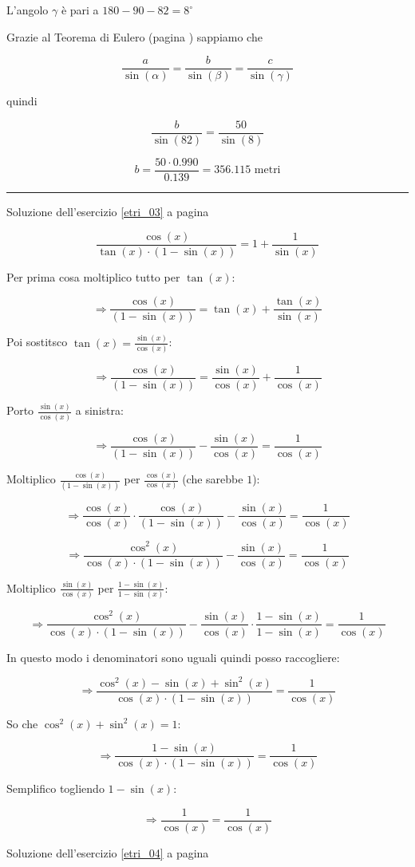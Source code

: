 L'angolo $\gamma$ è pari a $180-90-82=8^{\circ}$

Grazie al Teorema di Eulero (pagina \pageref{subs_euler}) sappiamo che 


\[
\frac{a}{\sin (\alpha)} = \frac{b}{\sin (\beta)} = \frac{c}{\sin (\gamma)}
\]

quindi

\[
\frac{b}{\sin (82)} = \frac{50}{\sin (8)}
\]

\[
b=\frac{50\cdot 0.990}{0.139}=356.115\textrm{ metri}
\]

\vspace{1cm}
\hrule
\vspace{1cm}

\begin{minipage}{\textwidth}
Soluzione dell'esercizio \ref{etri_03} a pagina \pageref{etri_03}\label{stri_03}


\[
\frac{
\cos(x)
}{
\tan(x)\cdot\left(1-\sin(x)\right)
} = 1+\frac{1}{\sin(x)}
\]


Per prima cosa moltiplico tutto per $\tan(x)$:

\[
\Rightarrow\frac{
\cos(x)
}{
\left(1-\sin(x)\right)
} = \tan(x)+\frac{\tan(x)}{\sin(x)}
\]

Poi sostitsco $\tan(x)=\frac{\sin(x)}{\cos(x)}$:


\[
\Rightarrow\frac{
\cos(x)
}{
\left(1-\sin(x)\right)
} = \frac{\sin(x)}{\cos(x)}+\frac{1}{\cos(x)}
\]

Porto $\frac{\sin(x)}{\cos(x)}$ a sinistra:

\[
\Rightarrow\frac{
\cos(x)
}{
\left(1-\sin(x)\right)
} 
-
\frac{\sin(x)}{\cos(x)}
= \frac{1}{\cos(x)}
\]

Moltiplico $\frac{
\cos(x)
}{
\left(1-\sin(x)\right)
}$ per $\frac{\cos(x)}{\cos(x)}$ (che sarebbe $1$):

\[
\Rightarrow
\frac{\cos(x)}{\cos(x)}
\cdot
\frac{
\cos(x)
}{
\left(1-\sin(x)\right)
} 
-
\frac{\sin(x)}{\cos(x)}
= \frac{1}{\cos(x)}
\]

\[
\Rightarrow
\frac{\cos^2(x)}{\cos(x)
\cdot
\left(1-\sin(x)\right)
} 
-
\frac{\sin(x)}{\cos(x)}
= \frac{1}{\cos(x)}
\]

Moltiplico $\frac{\sin(x)}{\cos(x)}$ per $\frac{1-\sin(x)}{1-\sin(x)}$:

\[
\Rightarrow
\frac{\cos^2(x)}{\cos(x)
\cdot
\left(1-\sin(x)\right)
} 
-
\frac{\sin(x)}{\cos(x)}
\cdot
\frac{1-\sin(x)}{1-\sin(x)}
= \frac{1}{\cos(x)}
\]

In questo modo i denominatori sono uguali quindi posso raccogliere:

\[
\Rightarrow
\frac{
\cos^2(x)-\sin(x)+\sin^2(x)}
{
\cos(x)\cdot
\left(1-\sin(x)\right)
} 
= \frac{1}{\cos(x)}
\]

So che $\cos^2(x)+\sin^2(x)=1$:

\[
\Rightarrow
\frac{
1-\sin(x)
}{
\cos(x)\cdot
\left(1-\sin(x)\right)
} 
= \frac{1}{\cos(x)}
\]

Semplifico togliendo $1-\sin(x)$:


\[
\Rightarrow
\frac{
1
}{
\cos(x)
} 
= \frac{1}{\cos(x)}
\]

\end{minipage}
Soluzione dell'esercizio \ref{etri_04} a pagina \pageref{etri_04}\label{stri_04}

